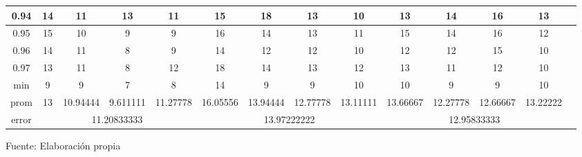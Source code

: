 \begin{center}
\begin{table}[H]
{\begin{tabular}{|c|c|c|c|c|c|c|c|c|c|c|c|c|c|}
\hline 
0.94 & 
14 & 11 & 13 & 11 & 15 & 18 & 13 & 10 & 13 & 14 & 16 & 13 \\
\hline 
0.95 & 
15 & 10 & 9 & 9 & 16 & 14 & 13 & 11 & 15 & 14 & 16 & 12 \\
\hline 
0.96 & 
14 & 11 & 8 & 9 & 14 & 12 & 12 & 10 & 12 & 12 & 15 & 10 \\
\hline 
0.97 & 
13 & 11 & 8 & 12 & 18 & 14 & 13 & 12 & 13 & 11 & 12 & 10 \\
\hline 
min & 
9 & 9 & 7 & 8 & 14 & 9 & 9 & 10 & 10 & 9 & 9 & 10 \\
\hline 
prom & 
13 & 10.94444 & 9.611111 & 11.27778 & 16.05556 & 13.94444 & 12.77778 & 13.11111 & 13.66667 & 12.27778 & 12.66667 & 13.22222 \\
\hline 
error & 
\multicolumn{4}{c|}{11.20833333} & 
\multicolumn{4}{c|}{13.97222222} & 
\multicolumn{4}{c|}{12.95833333}\\ 
\hline 
\end{tabular} 
}
\begin{center}
\vskip 0.2cm
{\small{Fuente: Elaboración propia}}
\end{center}
\end{table}
\end{center}

